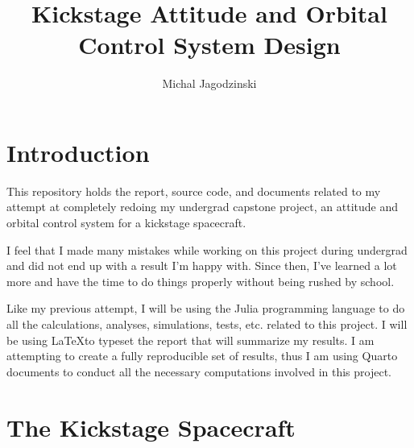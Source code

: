 \documentclass{tufte-handout}
\title{Kickstage Attitude and Orbital Control System Design}
\author{Michal Jagodzinski}
\date{}
\begin{document}
\maketitle

\newpage
\tableofcontents

\newpage
\section{Introduction}

This repository holds the report, source code, and documents related to my attempt at completely redoing my undergrad capstone project, an attitude and orbital control system for a kickstage spacecraft.

I feel that I made many mistakes while working on this project during undergrad and did not end up with a result I'm happy with. Since then, I've learned a lot more and have the time to do things properly without being rushed by school.

Like my previous attempt, I will be using the Julia programming language to do all the calculations, analyses, simulations, tests, etc. related to this project. I will be using \LaTeX to typeset the report that will summarize my results. I am attempting to create a fully reproducible set of results, thus I am using Quarto documents to conduct all the necessary computations involved in this project.

\newpage
\section{The Kickstage Spacecraft}
\end{document}
